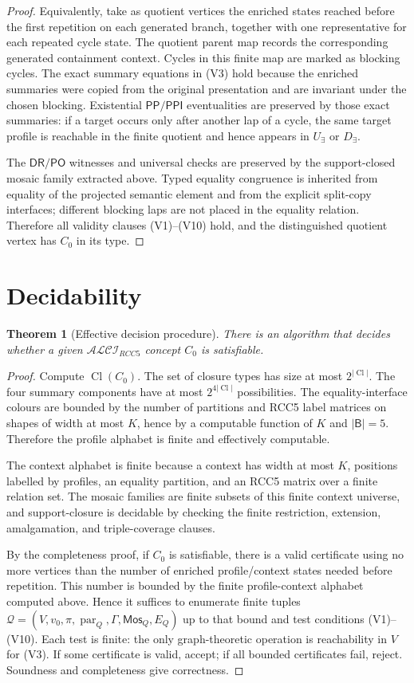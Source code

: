 \documentclass[11pt]{article}
\newtheorem{theorem}[definition]{Theorem}
\theoremstyle{remark}
\newcommand{\Logic}{\mathcal{ALCI}_{RCC5}}
\newcommand{\Base}{\mathsf{B}}
\newcommand{\DR}{\mathsf{DR}}
\newcommand{\PO}{\mathsf{PO}}
\newcommand{\PP}{\mathsf{PP}}
\newcommand{\PPI}{\mathsf{PPI}}
\newcommand{\Cl}{\operatorname{Cl}}
\newcommand{\Mos}{\mathsf{Mos}}
\newcommand{\parr}{\operatorname{par}}
\newcommand{\Q}{\mathcal{Q}}
\begin{document}
\begin{proof}
Equivalently, take as quotient vertices the enriched states reached before the first repetition on each generated branch, together with one representative for each repeated cycle state.  The quotient parent map records the corresponding generated containment context.  Cycles in this finite map are marked as blocking cycles.  The exact summary equations in (V3) hold because the enriched summaries were copied from the original presentation and are invariant under the chosen blocking.  Existential $\PP/\PPI$ eventualities are preserved by those exact summaries: if a target occurs only after another lap of a cycle, the same target profile is reachable in the finite quotient and hence appears in $U_\exists$ or $D_\exists$.

The $\DR/\PO$ witnesses and universal checks are preserved by the support-closed mosaic family extracted above.  Typed equality congruence is inherited from equality of the projected semantic element and from the explicit split-copy interfaces; different blocking laps are not placed in the equality relation.  Therefore all validity clauses (V1)--(V10) hold, and the distinguished quotient vertex has $C_0$ in its type.
\end{proof}

\section{Decidability}
\begin{theorem}[Effective decision procedure]\label{thm:decidable}
There is an algorithm that decides whether a given $\Logic$ concept $C_0$ is satisfiable.
\end{theorem}
\begin{proof}
Compute $\Cl(C_0)$.  The set of closure types has size at most $2^{|\Cl|}$.  The four summary components have at most $2^{4|\Cl|}$ possibilities.  The equality-interface colours are bounded by the number of partitions and RCC5 label matrices on shapes of width at most $K$, hence by a computable function of $K$ and $|\Base|=5$.  Therefore the profile alphabet is finite and effectively computable.

The context alphabet is finite because a context has width at most $K$, positions labelled by profiles, an equality partition, and an RCC5 matrix over a finite relation set.  The mosaic families are finite subsets of this finite context universe, and support-closure is decidable by checking the finite restriction, extension, amalgamation, and triple-coverage clauses.

By the completeness proof, if $C_0$ is satisfiable, there is a valid certificate using no more vertices than the number of enriched profile/context states needed before repetition.  This number is bounded by the finite profile-context alphabet computed above.  Hence it suffices to enumerate finite tuples $\Q=(V,v_0,\pi,\parr_Q,\Gamma,\Mos_Q,E_Q)$ up to that bound and test conditions (V1)--(V10).  Each test is finite: the only graph-theoretic operation is reachability in $V$ for (V3).  If some certificate is valid, accept; if all bounded certificates fail, reject.  Soundness and completeness give correctness.
\end{proof}
\end{document}
